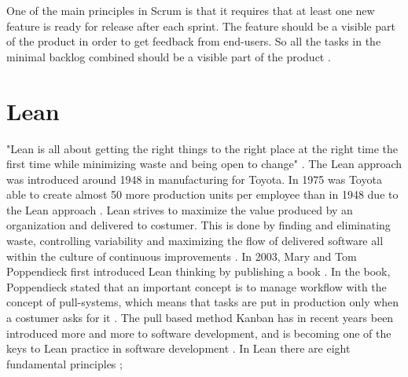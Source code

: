 \documentclass[UKenglish]{ifimaster}  %
\begin{document}
One of the main principles in Scrum is that it requires that at least one new feature is ready for release after each sprint. The feature should be a visible part of the product in order to get feedback from end-users. So all the tasks in the minimal backlog combined should be a visible part of the product \parencite{Scrum}.


\section {Lean}
\label{sec:Lean}
"Lean is all about getting the right things to the right place at the right time the first time while minimizing waste and being open to change" \parencite{741480}.
The Lean approach was introduced around 1948 in manufacturing for Toyota.  In 1975 was Toyota able to create almost 50 more production units per employee than in 1948 due to the Lean approach \parencite{manning}. Lean strives to maximize the value produced by an organization and delivered to costumer. This is done by finding and eliminating waste, controlling variability and maximizing the flow of delivered software all within the culture of continuous improvements \parencite{DavidAnderson}. In 2003, Mary and Tom Poppendieck first introduced Lean thinking  by publishing a book \parencite{Lean:2003}. In the book, Poppendieck stated that an important concept is to manage workflow with the concept of pull-systems, which means that tasks are put in production only when a costumer asks for it \parencite{Lean:2009}.
The pull based method Kanban has in recent years been introduced more and more to software development, and is becoming one of the keys to Lean practice in software development \parencite{DavidAnderson}. In Lean there are eight fundamental principles \parencite{poppendieck2003lean};
\end{document}
